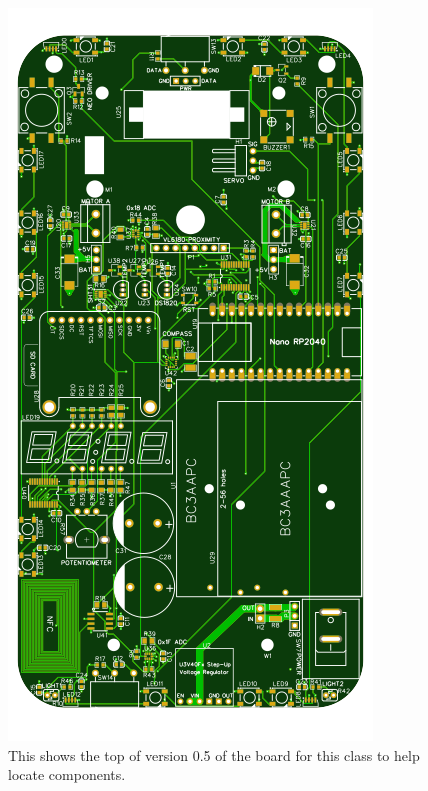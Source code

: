 \begin{figure}[!htb]
	\centering
	\includegraphics[scale=1.0]{arduinoStart/CEC326v0.5-PCB.png} %
	\caption{This shows the top of version 0.5 of the board for this class to help locate components.}
	\label{fig:boardTop}
\end{figure} 

